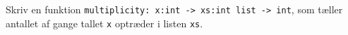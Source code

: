 Skriv en funktion \lstinline{multiplicity: x:int -> xs:int list -> int}, som tæller antallet af gange tallet \lstinline{x} optræder i listen \lstinline{xs}.
